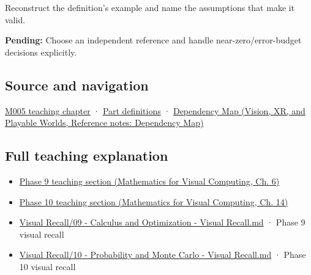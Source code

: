 Reconstruct the definition's example and name the assumptions that make it valid.

\textbf{Pending:} Choose an independent reference and handle near-zero/error-budget decisions explicitly.

\subsection{Source and navigation}\label{appendix-3ae74e89b4e6-source-and-navigation}

\hyperref[01-foundations-i-ch001-when-arithmetic-meets-uncertainty]{M005 teaching chapter} · \hyperref[appendix-fd090d982a15-m005---parts-77-88]{Part definitions} · \href{../07-Vision-XR-and-Playable-Worlds/main.pdf\#nameddest=appendix-4ad47bdd269a}{Dependency Map (Vision, XR, and Playable Worlds, Reference notes: Dependency Map)}

\subsection{Full teaching explanation}\label{appendix-3ae74e89b4e6-full-teaching-explanation}

\begin{itemize}
\tightlist
\item
  \href{../02-Mathematics-for-Visual-Computing/main.pdf\#nameddest=02-foundations-ii-ch022-numerical-differentiation-and-automatic-differentiation}{Phase 9 teaching section (Mathematics for Visual Computing, Ch. 6)}
\item
  \href{../02-Mathematics-for-Visual-Computing/main.pdf\#nameddest=02-foundations-ii-ch030-inference-and-error-metrics-need-explicit-assumptions}{Phase 10 teaching section (Mathematics for Visual Computing, Ch. 14)}
\item
  \hyperref[appendix-adf48f5dc5c1]{Visual Recall/09 - Calculus and Optimization - Visual Recall.md} · Phase 9 visual recall
\item
  \hyperref[appendix-cb5af353ef77]{Visual Recall/10 - Probability and Monte Carlo - Visual Recall.md} · Phase 10 visual recall
\end{itemize}
